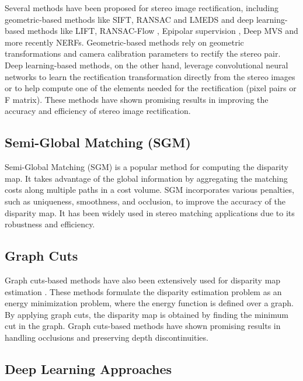 \documentclass[10pt,twocolumn,letterpaper]{article}
\begin{document}
Several methods have been proposed for stereo image rectification, including geometric-based methods like SIFT\cite{lindebergScaleInvariantFeature2012}, RANSAC\cite{fischlerRandomSampleConsensus1981} and LMEDS \cite{lmeds} and deep learning-based methods like LIFT\cite{yiLIFTLearnedInvariant2016}, RANSAC-Flow \cite{shenRANSACFlowGenericTwostage2020}, Epipolar supervision \cite{darmonLearningGuideLocal2020}, Deep MVS\cite{huangDeepMVSLearningMultiview2018} and more recently NERFs\cite{mildenhallNeRFRepresentingScenes2020}. Geometric-based methods rely on geometric transformations and camera calibration parameters to rectify the stereo pair. Deep learning-based methods, on the other hand, leverage convolutional neural networks to learn the rectification transformation directly from the stereo images or to help compute one of the elements needed for the rectification (pixel pairs or F matrix). These methods have shown promising results in improving the accuracy and efficiency of stereo image rectification.

\subsection{Semi-Global Matching (SGM)}

Semi-Global Matching\cite{hirschmullerAccurateEfficientStereo2005a} (SGM) is a popular method for computing the disparity map. It takes advantage of the global information by aggregating the matching costs along multiple paths in a cost volume. SGM incorporates various penalties, such as uniqueness, smoothness, and occlusion, to improve the accuracy of the disparity map. It has been widely used in stereo matching applications due to its robustness and efficiency.

\subsection{Graph Cuts}

Graph cuts-based methods have also been extensively used for disparity map estimation \cite{kolomogorov}. These methods formulate the disparity estimation problem as an energy minimization problem, where the energy function is defined over a graph. By applying graph cuts, the disparity map is obtained by finding the minimum cut in the graph. Graph cuts-based methods have shown promising results in handling occlusions and preserving depth discontinuities.

\subsection{Deep Learning Approaches}
\end{document}
